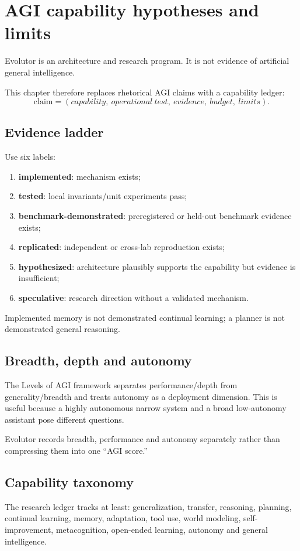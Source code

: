 \chapter{AGI capability hypotheses and limits}

Evolutor is an architecture and research program. It is not evidence of artificial general intelligence.

This chapter therefore replaces rhetorical AGI claims with a capability ledger:
\[
\boxed{\text{claim}=(capability,\ operational\ test,\ evidence,\ budget,\ limits)}.
\]

\section{Evidence ladder}
Use six labels:
\begin{enumerate}
\item \textbf{implemented}: mechanism exists;
\item \textbf{tested}: local invariants/unit experiments pass;
\item \textbf{benchmark-demonstrated}: preregistered or held-out benchmark evidence exists;
\item \textbf{replicated}: independent or cross-lab reproduction exists;
\item \textbf{hypothesized}: architecture plausibly supports the capability but evidence is insufficient;
\item \textbf{speculative}: research direction without a validated mechanism.
\end{enumerate}
Implemented memory is not demonstrated continual learning; a planner is not demonstrated general reasoning.

\section{Breadth, depth and autonomy}
The Levels of AGI framework separates performance/depth from generality/breadth and treats autonomy as a deployment dimension. This is useful because a highly autonomous narrow system and a broad low-autonomy assistant pose different questions.

Evolutor records breadth, performance and autonomy separately rather than compressing them into one ``AGI score.''

\section{Capability taxonomy}
The research ledger tracks at least: generalization, transfer, reasoning, planning, continual learning, memory, adaptation, tool use, world modeling, self-improvement, metacognition, open-ended learning, autonomy and general intelligence.

